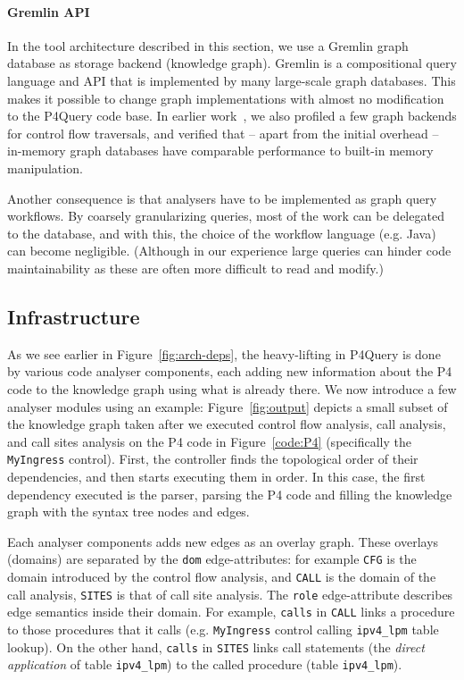 \documentclass[sigconf]{acmart}
\begin{document}
\paragraph{Gremlin API}
In the tool architecture described in this section, we use a Gremlin graph database as storage backend (knowledge graph). Gremlin is a compositional query language and API that is implemented by many large-scale graph databases. This makes it possible to change graph implementations with almost no modification to the P4Query code base. In earlier work~\cite{icai20}, we also profiled a few graph backends for control flow traversals, and verified that -- apart from the initial overhead -- in-memory graph databases have comparable performance to built-in memory manipulation. 

  Another consequence is that analysers have to be implemented as graph query workflows. By coarsely granularizing queries, most of the work can be delegated to the database, and with this, the choice of the workflow language (e.g. Java) can become negligible. 
(Although in our experience large queries can hinder code maintainability as these are often more difficult to read and modify.)

	
  \subsection{Infrastructure}\label{sec:infra} %
  As we see earlier in Figure~\ref{fig:arch-deps}, the heavy-lifting in P4Query is done by various code analyser components, each adding new information about the P4 code to the knowledge graph using what is already there. We now introduce a few analyser modules using an example: Figure~\ref{fig:output} depicts a small subset of the knowledge graph taken after we executed control flow analysis, call analysis, and call sites analysis on the P4 code in Figure~\ref{code:P4} (specifically the \texttt{MyIngress} control). 
  First, the controller finds the topological order of their dependencies, and then starts executing them in order. In this case, the first dependency executed is the parser, parsing the P4 code and filling the knowledge graph with the syntax tree nodes and edges. 

  Each analyser components adds new edges as an overlay graph. These overlays (domains) are separated by the \texttt{dom} edge-attributes: for example \texttt{CFG} is the domain introduced by the control flow analysis, and \texttt{CALL} is the domain of the call analysis, \texttt{SITES} is that of call site analysis. The \texttt{role} edge-attribute describes edge semantics inside their domain. For example, \texttt{calls} in \texttt{CALL} links a procedure to those procedures that it calls (e.g. \texttt{MyIngress} control calling \texttt{ipv4\_lpm} table lookup). On the other hand, \texttt{calls} in \texttt{SITES} links call statements (the \textit{direct application} of table \texttt{ipv4\_lpm}) to the called procedure (table \texttt{ipv4\_lpm}). 
  
\end{document}
